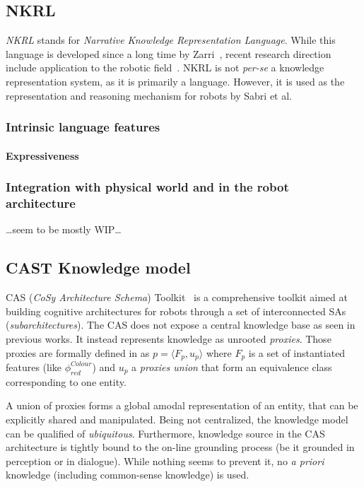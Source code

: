 \documentclass[a4paper, twocolumn]{article}
\begin{document}
\subsection{NKRL}
\label{sect|nkrl}

\emph{NKRL} stands for \emph{Narrative Knowledge Representation Language}.
While this language is developed since a long time by Zarri~\cite{Zarri1997,
Zarri2008}, recent research direction include application to the robotic
field~\cite{Sabri2011}. NKRL is not {\it per-se} a knowledge representation
system, as it is primarily a language. However, it is used as the
representation and reasoning mechanism for robots by Sabri et al.

\subsubsection{Intrinsic language features}
\label{sect|nkrl-intrinsic-features}

\paragraph{Expressiveness}

\subsubsection{Integration with physical world and in the robot architecture}
\label{sect|nkrl-integration}

\ldots seem to be mostly WIP\ldots


\subsection{CAST Knowledge model}
\label{sect|cast}

CAS (\emph{CoSy Architecture Schema}) Toolkit~\cite{Hawes2007} is a
comprehensive toolkit aimed at building cognitive architectures for robots
through a set of interconnected SAs (\emph{subarchitectures}). The CAS does not
expose a central knowledge base as seen in previous works. It instead
represents knowledge as unrooted \emph{proxies}. Those proxies are formally
defined in \cite{Jacobsson2008} as $p= \langle F_p, u_p \rangle$ where $F_p$ is
a set of instantiated features (like $\phi^{Colour}_{red}$) and $u_p$ a
\emph{proxies union} that form an equivalence class corresponding to one
entity.

A union of proxies forms a global amodal representation of an entity, that can
be explicitly shared and manipulated. Being not centralized, the knowledge
model can be qualified of \emph{ubiquitous}. Furthermore, knowledge source in
the CAS architecture is tightly bound to the on-line grounding process (be it
grounded in perception or in dialogue). While nothing seems to prevent it, no
{\it a priori} knowledge (including common-sense knowledge) is used.
\end{document}

